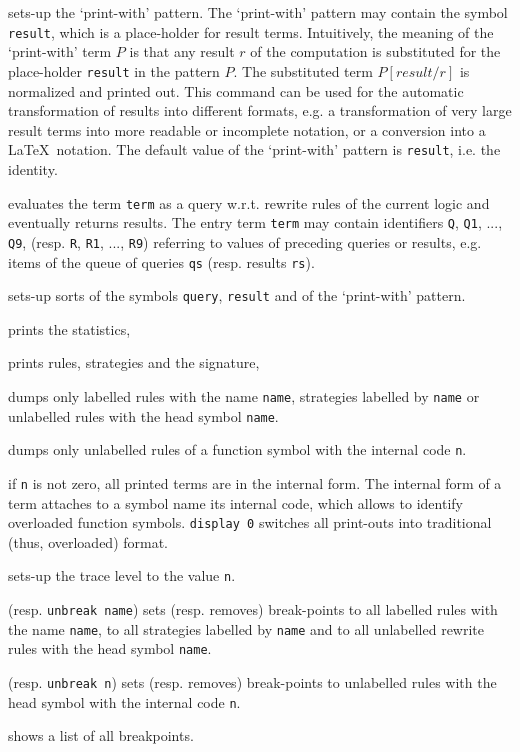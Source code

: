 \begin{description}
    sets-up the `print-with' pattern. The `print-with' pattern
    may contain the symbol \verb|result|, which is a place-holder for
    result terms. Intuitively, the meaning of the `print-with' term $P$
    is that any result $r$ of the computation is substituted for the
    place-holder \verb|result| in the pattern $P$. The substituted term
    $P[result/r]$ is normalized and printed out.
    This command can be used for the automatic transformation
    of results into different formats, e.g.
    a transformation of 
    very large result terms into more readable or incomplete
    notation, or a conversion into a \LaTeX\ notation.
    The default value of the `print-with' pattern is \verb|result|, i.e.
        the identity.
  \item
    [{\tt run term}]
    evaluates the term \verb|term| as a query w.r.t. rewrite rules of the current logic 
    and eventually returns results.
    The entry term \verb|term| may contain identifiers
    \verb|Q|, \verb|Q1|, ..., \verb|Q9|,
    (resp. \verb|R|, \verb|R1|, ..., \verb|R9|) 
    referring to values of preceding queries or results, e.g.
        items of the queue of queries {\tt qs}
    (resp. results {\tt rs}).
  \item
    [{\tt sorts type type type}]  
    sets-up sorts of the symbols \verb|query|, 
    \verb|result| and of the `print-with' pattern.
  \item
    [{\tt stat}]
    prints the statistics,
  \item
    [{\tt dump}] 
    prints rules, strategies and the signature,
  \item
    [{\tt dump name}]
    dumps only labelled rules with the name \verb|name|,
    strategies labelled by \verb|name| or
    unlabelled rules with the head symbol \verb|name|.
  \item
    [{\tt dump n}]     
    dumps only unlabelled rules of a function symbol with the 
    internal code \verb|n|.
  \item
    [{\tt display n}]  
    if \verb|n| is not zero, all printed terms are in the internal form.
    The internal form of a term attaches to a symbol name its internal code,
    which allows to identify overloaded function symbols.
    {\tt display 0} switches all print-outs into traditional (thus, overloaded)
    format.
  \item 
    [{\tt trace n}]
     sets-up the trace level to the value \verb|n|.
  \item
    [{\tt break name}] (resp. {\tt unbreak name})
    sets (resp. removes) break-points to all labelled rules 
    with the name \verb|name|, to all strategies 
    labelled by \verb|name| and to all unlabelled rewrite rules with 
    the head symbol \verb|name|.
  \item
    [{\tt break n}] (resp. {\tt unbreak n})
    sets (resp. removes) break-points to unlabelled rules with the head symbol 
    with the internal code \verb|n|.
  \item 
    [{\tt breaks}]
    shows a list of all breakpoints.
\end{description}

